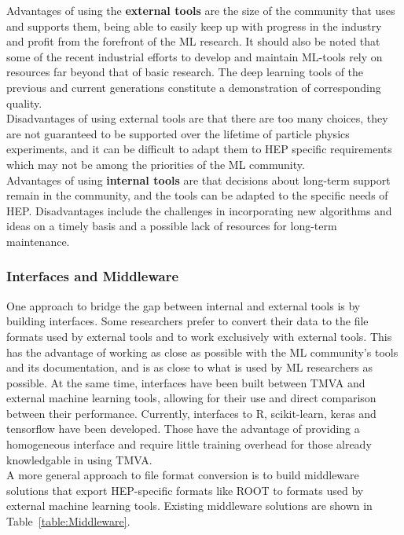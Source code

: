 Advantages of using the {\bf external tools} are the size of the community that uses and supports them, being able to easily keep up with progress in the industry and profit from the forefront of the ML research.
It should also be noted that some of the recent industrial efforts to develop and maintain ML-tools rely on resources far beyond that of basic research. The deep learning tools of the previous and current generations constitute a demonstration of corresponding quality.\\

Disadvantages of using external tools are that there are too many choices, they are not guaranteed to be supported over the lifetime of particle physics experiments, and it can be difficult to adapt them to HEP specific requirements which may not be among the priorities of the ML community.\\

Advantages of using {\bf internal tools} are that decisions about long-term support remain in the community, and the tools can be adapted to the specific needs of HEP. Disadvantages include the challenges in incorporating new algorithms and ideas on a timely basis and a possible lack of resources for long-term maintenance.

\subsubsection{Interfaces and Middleware}

One approach to bridge the gap between internal and external tools is by building interfaces. Some researchers prefer to convert their data to the file formats used by external tools and to work exclusively with external tools. This has the advantage of working as close as possible with the ML community's tools and its documentation, and is as close to what is used by ML researchers as possible.
At the same time, interfaces have been built between TMVA and external machine learning tools, allowing for their use and direct comparison between their performance. Currently, interfaces to R, scikit-learn, keras and tensorflow have been developed. Those have the advantage of providing a homogeneous interface and require little training overhead for those already knowledgable in using TMVA.\\

A more general approach to file format conversion is to build middleware solutions that export HEP-specific formats like ROOT to formats used by external machine learning tools.
Existing middleware solutions are shown in Table~\ref{table:Middleware}.

